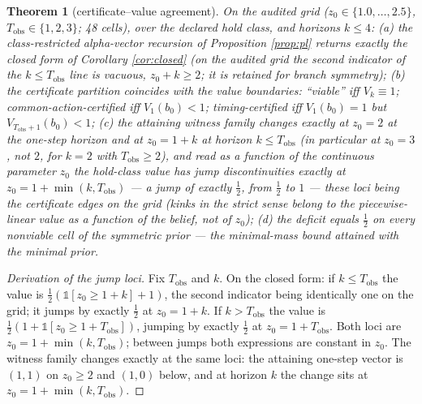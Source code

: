 \documentclass[10pt,twocolumn]{article}
\theoremstyle{plain}
\newtheorem{theorem}{Theorem}
\theoremstyle{definition}
\theoremstyle{remark}
\begin{document}
\begin{theorem}[certificate--value agreement]\label{thm:agree}
On the audited grid (\(z_{0} \in \{1.0, \dots, 2.5\}\),
\(T_{\mathrm{obs}} \in \{1,2,3\}\); 48 cells), over the declared hold
class, and horizons \(k \le 4\):
(a) the class-restricted alpha-vector recursion of Proposition
\ref{prop:pl} returns exactly the closed form of Corollary
\ref{cor:closed} (on the audited grid the second indicator of the
\(k \le T_{\mathrm{obs}}\) line is vacuous, \(z_{0} + k \ge 2\); it is
retained for branch symmetry);
(b) the certificate partition coincides with the value boundaries:
``viable'' iff \(V_{k} \equiv 1\); common-action-certified iff
\(V_{1}(b_{0}) < 1\); timing-certified iff \(V_{1}(b_{0}) = 1\) but
\(V_{T_{\mathrm{obs}}+1}(b_{0}) < 1\);
(c) the attaining witness family changes exactly at \(z_{0} = 2\) at the
one-step horizon and at \(z_{0} = 1 + k\) at horizon
\(k \le T_{\mathrm{obs}}\) (in particular at \(z_{0} = 3\), not \(2\),
for \(k = 2\) with \(T_{\mathrm{obs}} \ge 2\)), and read as a function of
the continuous parameter \(z_{0}\) the hold-class value has jump
discontinuities exactly at \(z_{0} = 1 + \min(k, T_{\mathrm{obs}})\) --- a
jump of exactly \(\tfrac{1}{2}\), from \(\tfrac{1}{2}\) to \(1\) --- these
loci being the certificate edges on the grid (kinks in the strict sense
belong to the piecewise-linear value as a function of the belief, not of
\(z_{0}\));
(d) the deficit equals \(\tfrac{1}{2}\) on every nonviable cell of the
symmetric prior --- the minimal-mass bound attained with the minimal
prior.
\end{theorem}

\begin{proof}[Derivation of the jump loci]
Fix \(T_{\mathrm{obs}}\) and \(k\). On the closed form: if
\(k \le T_{\mathrm{obs}}\) the value is
\(\tfrac{1}{2}(\mathbb{1}[z_{0} \ge 1 + k] + 1)\), the second indicator
being identically one on the grid; it jumps by exactly \(\tfrac{1}{2}\)
at \(z_{0} = 1 + k\). If \(k > T_{\mathrm{obs}}\) the value is
\(\tfrac{1}{2}(1 + \mathbb{1}[z_{0} \ge 1 + T_{\mathrm{obs}}])\),
jumping by exactly \(\tfrac{1}{2}\) at \(z_{0} = 1 + T_{\mathrm{obs}}\).
Both loci are \(z_{0} = 1 + \min(k, T_{\mathrm{obs}})\); between jumps
both expressions are constant in \(z_{0}\). The witness family changes
exactly at the same loci: the attaining one-step vector is \((1, 1)\) on
\(z_{0} \ge 2\) and \((1, 0)\) below, and at horizon \(k\) the change
sits at \(z_{0} = 1 + \min(k, T_{\mathrm{obs}})\).
\end{proof}
\end{document}
